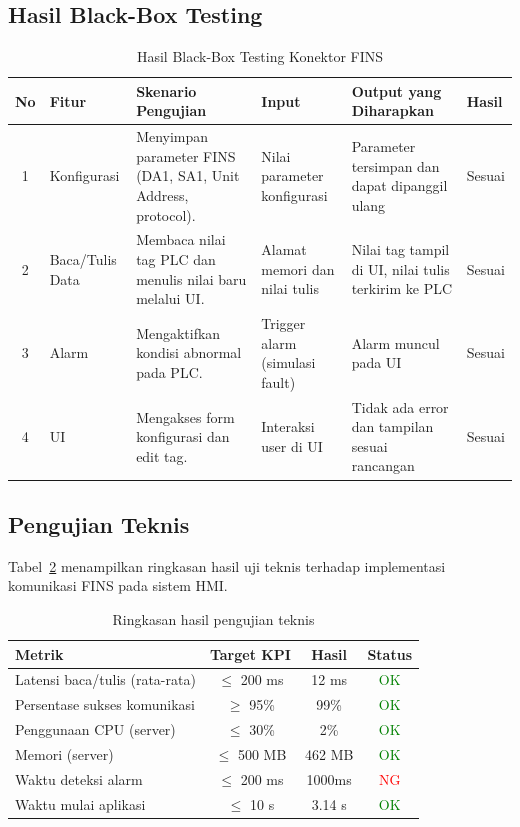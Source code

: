 \subsection{Hasil Black-Box Testing}
\begin{table}[H]
    \centering
    \begin{tabular}{|c|p{2cm}|p{3.5cm}|p{2cm}|p{3cm}|p{1.3cm}|}
        \hline
        \textbf{No} & \textbf{Fitur} & \textbf{Skenario Pengujian} & \textbf{Input} & \textbf{Output yang Diharapkan} & \textbf{Hasil} \\
        \hline
        1 & Konfigurasi & Menyimpan parameter FINS (DA1, SA1, Unit Address, protocol). & Nilai parameter konfigurasi & Parameter tersimpan dan dapat dipanggil ulang & Sesuai \\ \hline
        2 & Baca/Tulis Data & Membaca nilai tag PLC dan menulis nilai baru melalui UI. & Alamat memori dan nilai tulis & Nilai tag tampil di UI, nilai tulis terkirim ke PLC & Sesuai \\ \hline
        3 & Alarm & Mengaktifkan kondisi abnormal pada PLC. & Trigger alarm (simulasi fault) & Alarm muncul pada UI & Sesuai \\ \hline
        4 & UI & Mengakses form konfigurasi dan edit tag. & Interaksi user di UI & Tidak ada error dan tampilan sesuai rancangan & Sesuai \\ \hline
    \end{tabular}
    \caption{Hasil Black-Box Testing Konektor FINS}
    \label{tab:blackbox-result}
\end{table}


\subsection{Pengujian Teknis}
Tabel~\ref{tab:eval-results} menampilkan ringkasan hasil uji teknis terhadap implementasi komunikasi FINS pada sistem HMI.
\begin{table}[H]
    \centering
    \begin{tabular}{|l|c|c|c|}
        \hline
        \textbf{Metrik} & \textbf{Target KPI} & \textbf{Hasil} & \textbf{Status} \\ \hline
        Latensi baca/tulis (rata-rata) & $\leq$ 200 ms & 12 ms & \textcolor{green}{OK} \\ \hline
        Persentase sukses komunikasi & $\geq$ 95\% & 99\% & \textcolor{green}{OK} \\ \hline
        Penggunaan CPU (server) & $\leq$ 30\% & 2\% & \textcolor{green}{OK} \\ \hline
        Memori (server) & $\leq$ 500 MB & 462 MB & \textcolor{green}{OK} \\ \hline
        Waktu deteksi alarm & $\leq$ 200 ms & 1000ms & \textcolor{red}{NG} \\ \hline
        Waktu mulai aplikasi & $\leq$ 10 s & 3.14 s & \textcolor{green}{OK} \\ \hline
    \end{tabular}
    \caption{Ringkasan hasil pengujian teknis}
    \label{tab:eval-results}
\end{table}

